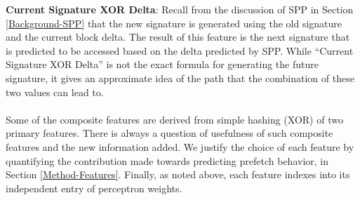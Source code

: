 %
\textbf{Current Signature XOR Delta}: Recall from the discussion of SPP in
Section \ref{Background-SPP} that the new signature is generated using the old
signature and the current block delta. The result of this feature is the next
signature that is predicted to be accessed based on the delta predicted by
SPP. While ``Current Signature XOR Delta'' is not the exact formula for
generating the future signature, it gives an approximate idea of the path that
the combination of these two values can lead to. \\ \\
%
%
%
Some of the composite features are derived from simple hashing (XOR)
of two primary features. There is always a question of usefulness of
such composite features and the new information added. We justify the
choice of each feature by quantifying the contribution made towards
predicting prefetch behavior, in Section \ref{Method-Features}.
Finally, as noted above, each feature indexes into its independent
entry of perceptron weights.

